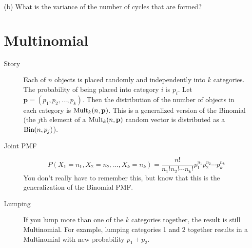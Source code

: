 \documentclass{article}
\begin{document}
(b) What is the variance of the number of cycles that are formed? \\



\section{Multinomial}

\begin{description}

\item[Story] Each of $n$ objects is placed randomly and independently into $k$ categories. The probability of being placed into category $i$ is $p_i$. Let $\mathbf{p} = (p_1, p_2, \dots, p_k)$. Then the distribution of the number of objects in each category is $\textrm{Mult}_k(n, \mathbf{p})$. This is a generalized version of the Binomial (the $j$th element of a $\textrm{Mult}_k(n, \mathbf{p})$ random vector is distributed as a $\textrm{Bin}(n, p_j)$).

\item[Joint PMF] $$P(X_1 = n_1, X_2 = n_2, \dots, X_k = n_k) = \frac{n!}{n_1!n_2!\cdots n_k!}p_1^{n_1}p_2^{n_2}\cdots p_k^{n_k}$$ You don't really have to remember this, but know that this is the generalization of the Binomial PMF.

\item[Lumping] If you lump more than one of the $k$ categories together, the result is still Multinomial. For example, lumping categories 1 and 2 together results in a Multinomial with new probability $p_1 + p_2$.

\end{description}
\end{document}
